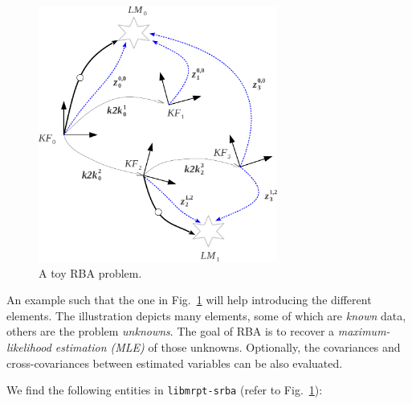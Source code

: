 \documentclass[a4paper,11pt]{article}
\begin{document}
\begin{figure}[h]
\centering
\includegraphics[width=0.7\textwidth]{imgs/srba_toy_problem.pdf} 
\caption{A toy RBA problem.}
\label{fig:rba.entities}
\end{figure}

An example such that the one in Fig.~\ref{fig:rba.entities} will help introducing the different elements.
The illustration depicts many elements, some of which are \emph{known} data, others are the problem \emph{unknowns}. 
The goal of RBA is to recover a \emph{maximum-likelihood estimation (MLE)} of those unknowns. Optionally, the covariances and 
cross-covariances between estimated variables can be also evaluated.

We find the following entities in \texttt{libmrpt-srba} (refer to Fig.~\ref{fig:rba.entities}):
\end{document}
